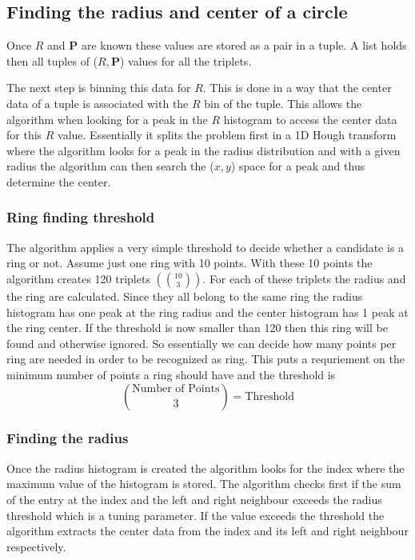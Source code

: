 \documentclass[11pt]{scrreprt}
\begin{document}
\subsection{Finding the radius and center of a circle} %
\label{sub:finding_the_radius_and_center_of_a_circle}
Once $R$ and $\mathbf{P}$ are known these values are stored as a pair in a tuple. A list holds then all tuples of ($R, \mathbf{P}$) values
for all the triplets.

The next step is binning this data for $R$. This is done in a way that the center data of a tuple is associated with the $R$ bin of the tuple.
This allows the algorithm when looking for a peak in the $R$ histogram to access the center data for this $R$ value. Essentially it
splits the problem first in a 1D Hough transform where the algorithm looks for a peak in the radius distribution and with a given radius
the algorithm can then search the ($x,y$) space for a peak and thus determine the center.

\subsubsection{Ring finding threshold} %
\label{sub:different_thresholds}
The algorithm applies a very simple threshold to decide whether a candidate is a ring or not. Assume just one ring with 10 points. With
these 10 points the algorithm creates 120 triplets $\left(\binom{10}{3}\right)$. For each of these triplets the radius and the ring are calculated.
Since they all belong to the same ring the radius histogram has one peak at the ring radius and the center histogram has 1 peak at
the ring center. If the threshold is now smaller than 120 then this ring will be found and otherwise ignored. So essentially we can 
decide how many points per ring are needed in order to be recognized as ring. This puts a requriement on the minimum number of points
a ring should have and the threshold is
\[
  \binom{\text{Number of Points}}{3} = \text{Threshold}
\]

\subsubsection{Finding the radius} %
\label{ssub:finding_the_radius}
Once the radius histogram is created the algorithm looks for the index where the maximum value of the histogram is stored. The algorithm
checks first if the sum of the entry at the index and the left and right neighbour exceeds the radius threshold which is a tuning parameter.
If the value exceeds the threshold the algorithm extracts the center data from the index and its left and right neighbour respectively.
\end{document}
